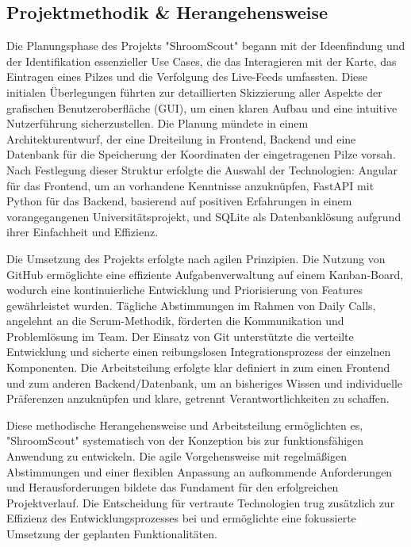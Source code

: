 \documentclass[../main.tex]{subfiles}
\begin{document}
\subsection{Projektmethodik \& Herangehensweise}

Die Planungsphase des Projekts "ShroomScout" begann mit der Ideenfindung und der Identifikation essenzieller Use Cases, 
die das Interagieren mit der Karte, das Eintragen eines Pilzes und die Verfolgung des Live-Feeds umfassten. Diese initialen 
Überlegungen führten zur detaillierten Skizzierung aller Aspekte der grafischen Benutzeroberfläche (GUI), um einen klaren 
Aufbau und eine intuitive Nutzerführung sicherzustellen. Die Planung mündete in einem Architekturentwurf, der eine Dreiteilung 
in Frontend, Backend und eine Datenbank für die Speicherung der Koordinaten der eingetragenen Pilze vorsah. Nach Festlegung 
dieser Struktur erfolgte die Auswahl der Technologien: Angular für das Frontend, um an vorhandene Kenntnisse anzuknüpfen, 
FastAPI mit Python für das Backend, basierend auf positiven Erfahrungen in einem vorangegangenen Universitätsprojekt, und 
SQLite als Datenbanklösung aufgrund ihrer Einfachheit und Effizienz.

Die Umsetzung des Projekts erfolgte nach agilen Prinzipien. Die Nutzung von GitHub ermöglichte eine effiziente Aufgabenverwaltung 
auf einem Kanban-Board, wodurch eine kontinuierliche Entwicklung und Priorisierung von Features gewährleistet wurden. Tägliche 
Abstimmungen im Rahmen von Daily Calls, angelehnt an die Scrum-Methodik, förderten die Kommunikation und Problemlösung im Team. 
Der Einsatz von Git unterstützte die verteilte Entwicklung und sicherte einen reibungslosen Integrationsprozess der einzelnen 
Komponenten. Die Arbeitsteilung erfolgte klar definiert in zum einen Frontend und zum anderen Backend/Datenbank, um an bisheriges
Wissen und individuelle Präferenzen anzuknüpfen und klare, getrennt Verantwortlichkeiten zu schaffen.

Diese methodische Herangehensweise und Arbeitsteilung ermöglichten es, "ShroomScout" systematisch von der Konzeption bis zur 
funktionsfähigen Anwendung zu entwickeln. Die agile Vorgehensweise mit regelmäßigen Abstimmungen und einer flexiblen Anpassung 
an aufkommende Anforderungen und Herausforderungen bildete das Fundament für den erfolgreichen Projektverlauf. Die Entscheidung 
für vertraute Technologien trug zusätzlich zur Effizienz des Entwicklungsprozesses bei und ermöglichte eine fokussierte Umsetzung 
der geplanten Funktionalitäten.
\end{document}
